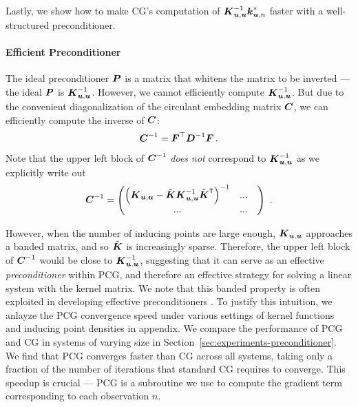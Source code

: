 Lastly, we show how to make CG's computation of $\boldsymbol{K}_{\boldsymbol{u}, \boldsymbol{u}}^{-1} \boldsymbol{k}^*_{\boldsymbol{u}, n}$ faster with a well-structured preconditioner. 

\paragraph{Efficient Preconditioner}
\label{sec:toeplitz-preconditioner}
The ideal preconditioner $\boldsymbol{P}$ is a matrix that whitens the matrix to be
inverted --- the ideal $\boldsymbol{P}$ is $\boldsymbol{K}_{\boldsymbol{u}, \boldsymbol{u}}^{-1}$.  However, we cannot
efficiently compute $\boldsymbol{K}_{\boldsymbol{u}, \boldsymbol{u}}^{-1}$. But due to the convenient
diagonalization of the circulant embedding matrix $\boldsymbol{C}$, we can
efficiently compute the inverse of $\boldsymbol{C}$: 
\begin{align}
    \boldsymbol{C}^{-1} = \boldsymbol{F}^\top \boldsymbol{D}^{-1} \boldsymbol{F} \, .
\end{align}
Note that the upper left block of
$\boldsymbol{C}^{-1}$ \emph{does not} correspond to $\boldsymbol{K}_{\boldsymbol{u}, \boldsymbol{u}}^{-1}$
as we explicitly write out
\begin{align}
    \boldsymbol{C}^{-1} =
    \begin{pmatrix}
    \left( \boldsymbol{K}_{\boldsymbol{u}, \boldsymbol{u}} - \tilde{\boldsymbol{K}} \boldsymbol{K}_{\boldsymbol{u}, \boldsymbol{u}}^{-1} \tilde{\boldsymbol{K}}^{\intercal}\right)^{-1} & ... \quad\\
    ... & ... \quad
    \end{pmatrix} \,\,.
\end{align}

However, when the number of inducing points are large enough,
$\boldsymbol{K}_{\boldsymbol{u},\boldsymbol{u}}$ approaches a banded matrix,
and so $\tilde{\boldsymbol{K}}$ is increasingly sparse.
Therefore, the upper left block of $\boldsymbol{C}^{-1}$ would be close to $\boldsymbol{K}_{\boldsymbol{u}, \boldsymbol{u}}^{-1}$, suggesting that it can serve as an effective \emph{preconditioner} within PCG,
and therefore an effective strategy for solving a linear system with the 
kernel matrix. %
We note that this banded property is often exploited in developing
effective preconditioners \citep{chan1996conjugate, saad2003iterative}.
To justify this intuition, we anlayze the PCG convergence speed under various settings of 
kernel functions and inducing point densities in appendix.
We compare the performance of PCG and CG in systems of varying size
in Section~\ref{sec:experiments-preconditioner}.
We find that PCG
converges faster than CG across all systems, 
taking only a fraction of the number
of iterations that standard CG requires to converge.
This speedup is crucial --- PCG is a subroutine we use to compute the gradient
term corresponding to each observation $n$.

